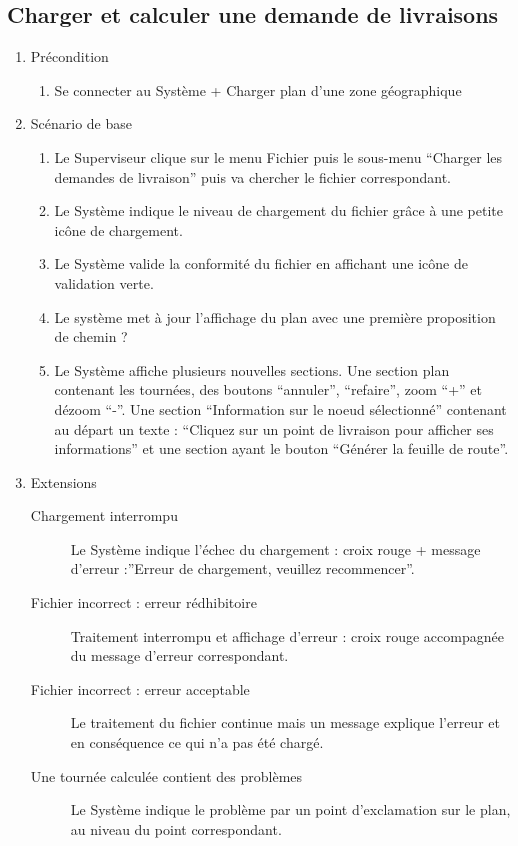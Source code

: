 \subsection{Charger et calculer une demande de livraisons}
\begin{enumerate}
\item Précondition
\begin{enumerate}
\item Se connecter au Système + Charger plan d’une zone géographique
\end{enumerate}


\item Scénario de base
\begin{enumerate}
\item Le Superviseur clique sur le menu Fichier puis le sous-menu “Charger les demandes de livraison” puis va chercher le fichier correspondant.  
\item Le Système indique le niveau de chargement du fichier grâce à une petite icône de chargement.
\item Le Système valide la conformité du fichier en affichant une icône de validation verte.
\item Le système met à jour l’affichage du plan avec une première proposition de chemin ?
\item Le Système affiche plusieurs nouvelles sections. Une section plan contenant les tournées, des boutons “annuler”, “refaire”, zoom “+” et dézoom “-”.  Une section “Information sur le noeud sélectionné” contenant au départ un texte : “Cliquez sur un point de livraison pour afficher ses informations” et une section ayant le bouton “Générer la feuille de route”.

\end{enumerate}

\item Extensions
\begin{description}
\item [Chargement interrompu] Le Système indique l’échec du chargement : croix rouge + message d’erreur :”Erreur de chargement, veuillez recommencer”.
\item [Fichier incorrect : erreur rédhibitoire] Traitement interrompu et affichage d’erreur :  croix rouge accompagnée du message d’erreur correspondant.
\item [Fichier incorrect : erreur acceptable] Le traitement du fichier continue mais un message explique l’erreur et en conséquence ce qui n’a pas été chargé.
\item [Une tournée calculée contient des problèmes] Le Système indique le problème par un point d'exclamation sur le plan, au niveau du point correspondant.
\end{description}
\end{enumerate}

